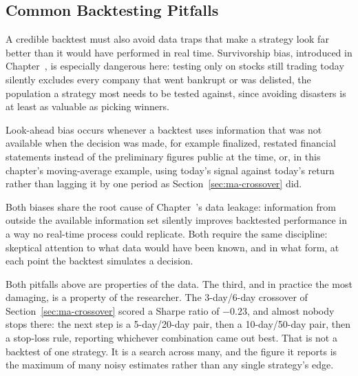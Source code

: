 \documentclass[../ai_in_finance]{subfiles}
\begin{document}
\subsection{Common Backtesting Pitfalls}

A credible backtest must also avoid data traps that make a strategy look far better than it would have performed in real time. Survivorship bias, introduced in Chapter~, is especially dangerous here: testing only on stocks still trading today silently excludes every company that went bankrupt or was delisted, the population a strategy most needs to be tested against, since avoiding disasters is at least as valuable as picking winners.

Look-ahead bias occurs whenever a backtest uses information that was not available when the decision was made, for example finalized, restated financial statements instead of the preliminary figures public at the time, or, in this chapter's moving-average example, using today's signal against today's return rather than lagging it by one period as Section~\ref{sec:ma-crossover} did.

Both biases share the root cause of Chapter~'s data leakage: information from outside the available information set silently improves backtested performance in a way no real-time process could replicate. Both require the same discipline: skeptical attention to what data would have been known, and in what form, at each point the backtest simulates a decision.

\label{sec:backtest-overfit}

Both pitfalls above are properties of the data. The third, and in practice the most damaging, is a property of the researcher. The 3-day/6-day crossover of Section~\ref{sec:ma-crossover} scored a Sharpe ratio of $-0.23$, and almost nobody stops there: the next step is a 5-day/20-day pair, then a 10-day/50-day pair, then a stop-loss rule, reporting whichever combination came out best. That is not a backtest of one strategy. It is a search across many, and the figure it reports is the maximum of many noisy estimates rather than any single strategy's edge.
\end{document}
